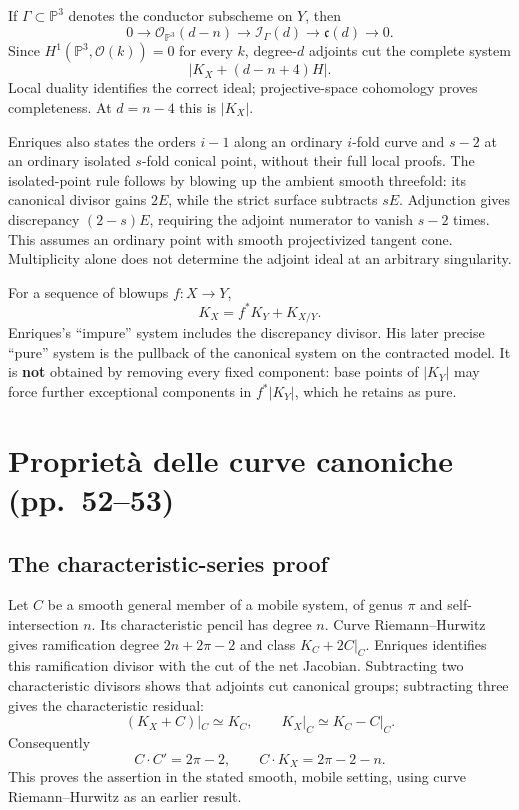 If \(\Gamma\subset\mathbb{P}^3\) denotes the conductor subscheme on \(Y\), then \[
0\to\mathcal O_{\mathbb{P}^3}(d-n)\to\mathcal I_\Gamma(d)
\to\mathfrak c(d)\to0.
\] Since \(H^1(\mathbb{P}^3,\mathcal O(k))=0\) for every \(k\), degree-\(d\) adjoints cut the complete system \[
\bigl|K_X+(d-n+4)H\bigr|.
\] Local duality identifies the correct ideal; projective-space cohomology proves completeness. At \(d=n-4\) this is \(|K_X|\).

Enriques also states the orders \(i-1\) along an ordinary \(i\)-fold curve and \(s-2\) at an ordinary isolated \(s\)-fold conical point, without their full local proofs. The isolated-point rule follows by blowing up the ambient smooth threefold: its canonical divisor gains \(2E\), while the strict surface subtracts \(sE\). Adjunction gives discrepancy \((2-s)E\), requiring the adjoint numerator to vanish \(s-2\) times. This assumes an ordinary point with smooth projectivized tangent cone. Multiplicity alone does not determine the adjoint ideal at an arbitrary singularity.

For a sequence of blowups \(f:X\to Y\), \[
K_X=f^*K_Y+K_{X/Y}.
\] Enriques's ``impure'' system includes the discrepancy divisor. His later precise ``pure'' system is the pullback of the canonical system on the contracted model. It is \textbf{not} obtained by removing every fixed component: base points of \(|K_Y|\) may force further exceptional components in \(f^*|K_Y|\), which he retains as pure.

\section[Proprietà delle curve canoniche]{Proprietà delle curve canoniche (pp.~52--53)}\label{commentary-II-5}

\subsection{The characteristic-series proof}

Let \(C\) be a smooth general member of a mobile system, of genus \(\pi\) and self-intersection \(n\). Its characteristic pencil has degree \(n\). Curve Riemann--Hurwitz gives ramification degree \(2n+2\pi-2\) and class \(K_C+2C|_C\). Enriques identifies this ramification divisor with the cut of the net Jacobian. Subtracting two characteristic divisors shows that adjoints cut canonical groups; subtracting three gives the characteristic residual: \[
(K_X+C)|_C\simeq K_C,\qquad K_X|_C\simeq K_C-C|_C.
\] Consequently \[
C\cdot C'=2\pi-2,\qquad C\cdot K_X=2\pi-2-n.
\] This proves the assertion in the stated smooth, mobile setting, using curve Riemann--Hurwitz as an earlier result.

